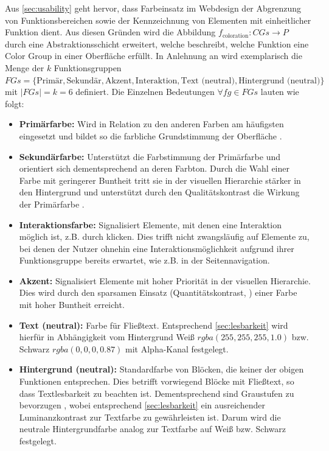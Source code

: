 Aus \autoref{sec:usability} geht hervor, dass Farbeinsatz im Webdesign der Abgrenzung von Funktionsbereichen sowie der Kennzeichnung von Elementen mit einheitlicher Funktion dient. Aus diesen Gründen wird die Abbildung $f_\text{coloration}: CGs \to P$ durch eine Abstraktionsschicht erweitert, welche beschreibt, welche Funktion eine Color Group in einer Oberfläche erfüllt. In Anlehnung an \citep{google,  smashing} wird exemplarisch die Menge der $k$ Funktionsgruppen $FGs = \{\text{Primär}, \text{Sekundär}, \text{Akzent}, \text{Interaktion}, \text{Text (neutral)}, \text{Hintergrund (neutral)}\}$ mit $|FGs| = k = 6$ definiert. Die Einzelnen Bedeutungen $\forall fg \in FGs$ lauten wie folgt:

\begin{itemize}
	\item \textbf{Primärfarbe:} Wird in Relation zu den anderen Farben am häufigsten eingesetzt und bildet so die farbliche Grundstimmung der Oberfläche \citep{awwwards}.
	\item \textbf{Sekundärfarbe:} Unterstützt die Farbstimmung der Primärfarbe und orientiert sich dementsprechend an deren Farbton. Durch die Wahl einer Farbe mit geringerer Buntheit tritt sie in der visuellen Hierarchie stärker in den Hintergrund \citep{visual-hierarchy} und unterstützt durch den Qualitätskontrast die Wirkung der Primärfarbe \citep{webdesign}.
	\item \textbf{Interaktionsfarbe:} Signalisiert Elemente, mit denen eine Interaktion möglich ist, z.B. durch klicken. Dies trifft nicht zwangsläufig auf Elemente zu, bei denen der Nutzer ohnehin eine Interaktionsmöglichkeit aufgrund ihrer Funktionsgruppe bereits erwartet, wie z.B. in der Seitennavigation.
	\item \textbf{Akzent:} Signalisiert Elemente mit hoher Priorität in der visuellen Hierarchie. Dies wird durch den sparsamen Einsatz (Quantitätskontrast, \citep{webdesign}) einer Farbe mit hoher Buntheit \citep{visual-hierarchy} erreicht.
	\item \textbf{Text (neutral):} Farbe für Fließtext. Entsprechend \autoref{sec:lesbarkeit} wird hierfür in Abhängigkeit vom Hintergrund Weiß $rgba(255, 255, 255, 1.0)$ bzw. Schwarz $rgba(0, 0, 0, 0.87)$ mit Alpha-Kanal festgelegt.
	\item \textbf{Hintergrund (neutral):} Standardfarbe von Blöcken, die keiner der obigen Funktionen entsprechen. Dies betrifft vorwiegend Blöcke mit Fließtext, so dass Textlesbarkeit zu beachten ist. Dementsprechend sind Graustufen zu bevorzugen \citep{webx0}, wobei entsprechend \autoref{sec:lesbarkeit} ein ausreichender Luminanzkontrast zur Textfarbe zu gewährleisten ist. Darum wird die neutrale Hintergrundfarbe analog zur Textfarbe auf Weiß bzw. Schwarz festgelegt.
\end{itemize}

